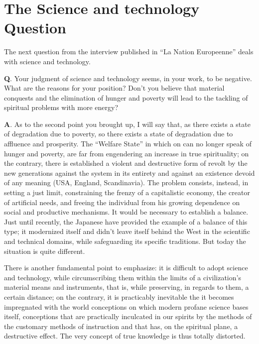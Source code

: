 \section{The Science and technology Question}

\begin{quotex}
The next question from the interview published in ``La Nation Europeenne'' deals with science and technology.
\end{quotex}

\textbf{Q}. Your judgment of science and technology seems, in your work, to be negative. What are the reasons for your position? Don't you believe that material conquests and the elimination of hunger and poverty will lead to the tackling of spiritual problems with more energy?

\textbf{A}. As to the second point you brought up, I will say that, as there exists a state of degradation due to poverty, so there exists a state of degradation due to affluence and prosperity. The ``Welfare State'' in which on can no longer speak of hunger and poverty, are far from engendering an increase in true spirituality; on the contrary, there is established a violent and destructive form of revolt by the new generations against the system in its entirety and against an existence devoid of any meaning (USA, England, Scandinavia). The problem consists, instead, in setting a just limit, constraining the frenzy of a capitalistic economy, the creator of artificial needs, and freeing the individual from his growing dependence on social and productive mechanisms. It would be necessary to establish a balance. Just until recently, the Japanese have provided the example of a balance of this type; it modernized itself and didn't leave itself behind the West in the scientific and technical domains, while safeguarding its specific traditions. But today the situation is quite different.

There is another fundamental point to emphasize: it is difficult to adopt science and technology, while circumscribing them within the limits of a civilization's material means and instruments, that is, while preserving, in regards to them, a certain distance; on the contrary, it is practicably inevitable the it becomes impregnated with the world conceptions on which modern profane science bases itself, conceptions that are practically inculcated in our spirits by the methods of the customary methods of instruction and that has, on the spiritual plane, a destructive effect. The very concept of true knowledge is thus totally distorted.

